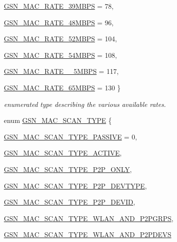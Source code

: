 \begin{DoxyCompactItemize}
\par
\hyperlink{a00642_gga260da9755b2bec5e93c8b16a5a92d41da4ff541ec828e47779ab515bbce812432}{GSN\_\-MAC\_\-RATE\_\-39MBPS} =  78, 
\par
\hyperlink{a00642_gga260da9755b2bec5e93c8b16a5a92d41da90c278dcfd04b86e79b797239b3b133b}{GSN\_\-MAC\_\-RATE\_\-48MBPS} =  96, 
\par
\hyperlink{a00642_gga260da9755b2bec5e93c8b16a5a92d41dae36e5884dc5c75b3d0d06a9199213993}{GSN\_\-MAC\_\-RATE\_\-52MBPS} =  104, 
\par
\hyperlink{a00642_gga260da9755b2bec5e93c8b16a5a92d41daa73db96531738bd3cc757599330b490c}{GSN\_\-MAC\_\-RATE\_\-54MBPS} =  108, 
\par
\hyperlink{a00642_gga260da9755b2bec5e93c8b16a5a92d41da4fc0e557eb2aca6c25f56228efe4a365}{GSN\_\-MAC\_\-RATE\_\_\-5MBPS} =  117, 
\par
\hyperlink{a00642_gga260da9755b2bec5e93c8b16a5a92d41da3225e2fa7882610a3a764e0ccf7499a6}{GSN\_\-MAC\_\-RATE\_\-65MBPS} =  130
 \}
\begin{DoxyCompactList}\small\item\em enumerated type describing the various available rates. \end{DoxyCompactList}\item 
enum \hyperlink{a00642_gacd7033290927ecd0c0b3b6e9829ecb2e}{GSN\_\-MAC\_\-SCAN\_\-TYPE} \{ \par
\hyperlink{a00642_ggacd7033290927ecd0c0b3b6e9829ecb2ea365bc3b0d49cef29862eaefb8e74c58c}{GSN\_\-MAC\_\-SCAN\_\-TYPE\_\-PASSIVE} =  0, 
\par
\hyperlink{a00642_ggacd7033290927ecd0c0b3b6e9829ecb2ea8807821495b972487d959e08e67d1dd0}{GSN\_\-MAC\_\-SCAN\_\-TYPE\_\-ACTIVE}, 
\par
\hyperlink{a00642_ggacd7033290927ecd0c0b3b6e9829ecb2ea3b09e6f9740ed6f5510747c59b2e3af3}{GSN\_\-MAC\_\-SCAN\_\-TYPE\_\-P2P\_\-ONLY}, 
\par
\hyperlink{a00642_ggacd7033290927ecd0c0b3b6e9829ecb2ea148a646044a62921ae0f6f15a49d427d}{GSN\_\-MAC\_\-SCAN\_\-TYPE\_\-P2P\_\-DEVTYPE}, 
\par
\hyperlink{a00642_ggacd7033290927ecd0c0b3b6e9829ecb2ea42dc80aa1ea641af49db305afc3dd664}{GSN\_\-MAC\_\-SCAN\_\-TYPE\_\-P2P\_\-DEVID}, 
\par
\hyperlink{a00642_ggacd7033290927ecd0c0b3b6e9829ecb2ea922992fd8398f8d60e90a33674583b24}{GSN\_\-MAC\_\-SCAN\_\-TYPE\_\-WLAN\_\-AND\_\-P2PGRPS}, 
\par
\hyperlink{a00642_ggacd7033290927ecd0c0b3b6e9829ecb2eaff33c56427944572c294ced551b38993}{GSN\_\-MAC\_\-SCAN\_\-TYPE\_\-WLAN\_\-AND\_\-P2PDEVS}

\end{DoxyCompactItemize}
